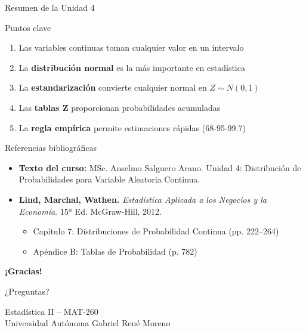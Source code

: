 \documentclass[10pt]{beamer}
\begin{document}
\begin{frame}{Resumen de la Unidad 4}
\begin{block}{Puntos clave}
\begin{enumerate}
  \item Las variables continuas toman cualquier valor en un intervalo
  \item La \textbf{distribución normal} es la más importante en estadística
  \item La \textbf{estandarización} convierte cualquier normal en $Z \sim N(0,1)$
  \item Las \textbf{tablas Z} proporcionan probabilidades acumuladas
  \item La \textbf{regla empírica} permite estimaciones rápidas (68-95-99.7)
\end{enumerate}
\end{block}

\vspace{0.3cm}
\begin{exampleblock}{Referencias bibliográficas}
\begin{itemize}
  \item \textbf{Texto del curso:} MSc. Anselmo Salguero Arano. Unidad 4: Distribución de Probabilidades para Variable Aleatoria Continua.
  \item \textbf{Lind, Marchal, Wathen.} \textit{Estadística Aplicada a los Negocios y la Economía}. 15ª Ed. McGraw-Hill, 2012.
  \begin{itemize}
    \item Capítulo 7: Distribuciones de Probabilidad Continua (pp. 222--264)
    \item Apéndice B: Tablas de Probabilidad (p. 782)
  \end{itemize}
\end{itemize}
\end{exampleblock}
\end{frame}

\begin{frame}[plain]
\begin{center}
\vspace{2cm}
{\Huge\textcolor{celeste}{\textbf{¡Gracias!}}}

\vspace{1cm}
{\Large\textcolor{grisOscuro}{¿Preguntas?}}

\vspace{2cm}

\vspace{0.5cm}
{\footnotesize\textcolor{grisOscuro}{Estadística II -- MAT-260\\
Universidad Autónoma Gabriel René Moreno}}
\end{center}
\end{frame}
\end{document}
